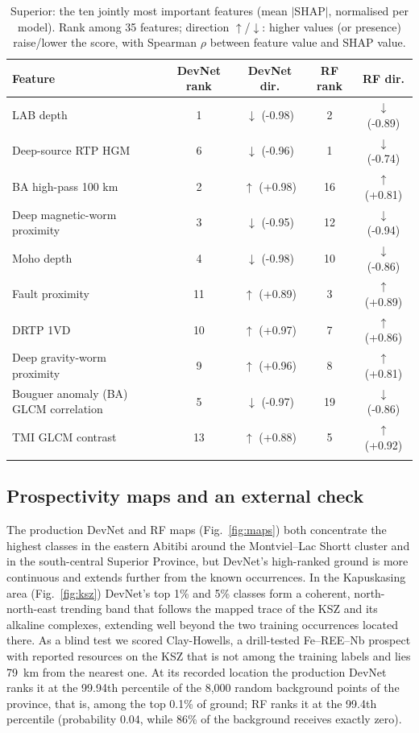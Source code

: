 \documentclass[pdflatex,sn-apa]{sn-jnl}
\begin{document}
\begin{table}[t]
\caption{Superior: the ten jointly most important features (mean $|$SHAP$|$, normalised per model). Rank among 35 features; direction $\uparrow$/$\downarrow$: higher values (or presence) raise/lower the score, with Spearman $\rho$ between feature value and SHAP value.}\label{tab:shap}
\scriptsize
\setlength{\tabcolsep}{2.5pt}
\begin{tabular*}{\textwidth}{@{\extracolsep\fill}lcccc}
\toprule
Feature & DevNet rank & DevNet dir. & RF rank & RF dir. \\
\midrule
LAB depth & 1 & $\downarrow$ (-0.98) & 2 & $\downarrow$ (-0.89) \\
Deep-source RTP HGM & 6 & $\downarrow$ (-0.96) & 1 & $\downarrow$ (-0.74) \\
BA high-pass 100 km & 2 & $\uparrow$ (+0.98) & 16 & $\uparrow$ (+0.81) \\
Deep magnetic-worm proximity & 3 & $\downarrow$ (-0.95) & 12 & $\downarrow$ (-0.94) \\
Moho depth & 4 & $\downarrow$ (-0.98) & 10 & $\downarrow$ (-0.86) \\
Fault proximity & 11 & $\uparrow$ (+0.89) & 3 & $\uparrow$ (+0.89) \\
DRTP 1VD & 10 & $\uparrow$ (+0.97) & 7 & $\uparrow$ (+0.86) \\
Deep gravity-worm proximity & 9 & $\uparrow$ (+0.96) & 8 & $\uparrow$ (+0.81) \\
Bouguer anomaly (BA) GLCM correlation & 5 & $\downarrow$ (-0.97) & 19 & $\downarrow$ (-0.86) \\
TMI GLCM contrast & 13 & $\uparrow$ (+0.88) & 5 & $\uparrow$ (+0.92) \\
\botrule
\end{tabular*}
\end{table}

\subsection{Prospectivity maps and an external check}\label{sec:res-maps}

The production DevNet and RF maps (Fig.~\ref{fig:maps}) both concentrate the highest classes in the eastern Abitibi around the Montviel--Lac Shortt cluster and in the south-central Superior Province, but DevNet's high-ranked ground is more continuous and extends further from the known occurrences. In the Kapuskasing area (Fig.~\ref{fig:ksz}) DevNet's top 1\% and 5\% classes form a coherent, north-north-east trending band that follows the mapped trace of the KSZ and its alkaline complexes, extending well beyond the two training occurrences located there. As a blind test we scored Clay-Howells, a drill-tested Fe--REE--Nb prospect with reported resources on the KSZ \citep{OGS2011} that is not among the training labels and lies 79~km from the nearest one. At its recorded location the production DevNet ranks it at the 99.94th percentile of the 8,000 random background points of the province, that is, among the top 0.1\% of ground; RF ranks it at the 99.4th percentile (probability 0.04, while 86\% of the background receives exactly zero).
\end{document}
